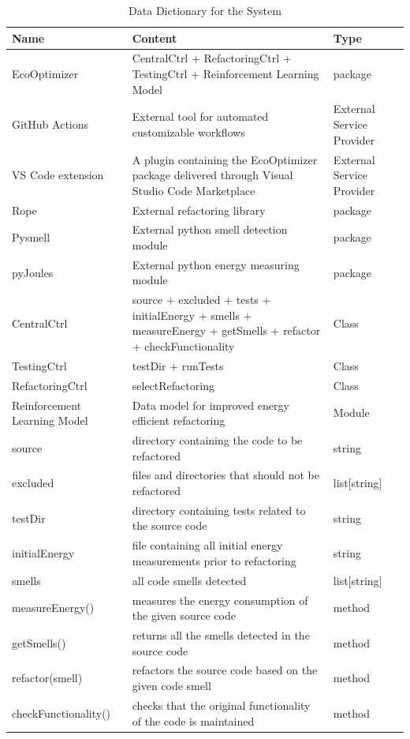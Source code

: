 \documentclass[12pt]{article}
\begin{document}
\begin{longtable}[H]{|p{3.5cm}|p{9cm}|p{2cm}|}
  \toprule 
  \textbf{Name} & \textbf{Content} & \textbf{Type} \\
  \midrule
  \endhead
  \bottomrule
  \caption{Data Dictionary for the System} 
  \label{tab:data-dict}
  \endlastfoot
  
  EcoOptimizer & CentralCtrl + RefactoringCtrl + TestingCtrl + Reinforcement Learning Model & package \\ \hline
  GitHub Actions & External tool for automated customizable workflows & External Service Provider \\ \hline
  VS Code extension & A plugin containing the EcoOptimizer package delivered through Visual Studio Code Marketplace & External Service Provider \\ \hline
  Rope & External refactoring library & package \\ \hline
  Pysmell & External python smell detection module & package \\ \hline
  pyJoules & External python energy measuring module & package \\ \hline
  CentralCtrl & source + excluded + tests + initialEnergy + smells + measureEnergy + getSmells + refactor + checkFunctionality & Class \\ \hline
  TestingCtrl & testDir + runTests & Class \\ \hline
  RefactoringCtrl & selectRefactoring & Class \\ \hline
  Reinforcement Learning Model & Data model for improved energy efficient refactoring & Module \\ \hline
  source & directory containing the code to be refactored & string \\ \hline
  excluded & files and directories that should not be refactored & list[string] \\ \hline
  testDir & directory containing tests related to the source code & string \\ \hline
  initialEnergy & file containing all initial energy measurements prior to refactoring & string \\ \hline
  smells & all code smells detected & list[string] \\ \hline
  measureEnergy() & measures the energy consumption of the given source code & method \\ \hline
  getSmells() & returns all the smells detected in the source code & method \\ \hline
  refactor(smell) & refactors the source code based on the given code smell & method \\ \hline
  checkFunctionality() & checks that the original functionality of the code is maintained & method \\
\end{longtable}
\end{document}
